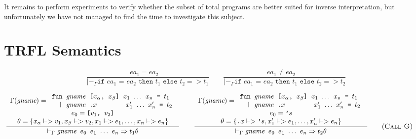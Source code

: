 \documentclass[10pt]{../sigplanconf}
\newcommand{\nfrac}[2]{\frac{\displaystyle{#1}}{\displaystyle{#2}}}
\newcommand{\tagsc}[1]{\tag{\scshape #1}}
\begin{document}
It remains to perform experiments to verify whether the subset of
total programs are better suited for inverse interpretation, but
unfortunately we have not managed to find the time to investigate this
subject.





\appendix
\section{TRFL Semantics}
\label{sec:semantics}


\begin{minipage}{2\linewidth}
  \centering

  \begin{equation}
    \nfrac{
      ea_1 = ea_2 \quad
    }{
      |-_\Gamma \texttt{if $ea_1$ = $ea_2$ then $t_1$ else $t_2$} => t_1
    }
    \qquad
    \nfrac{
      ea_1 \neq ea_2 \quad
    }{
      |-_\Gamma \texttt{if $ea_1$ = $ea_2$ then $t_1$ else $t_2$} => t_2
    } \tagsc{If}
\end{equation}

\begin{equation}
\hspace{-0.7cm}
  \nfrac{
    \begin{array}{c}
      \Gamma(\textit{gname}) =
      \begin{array}{l}
        \texttt{fun \textit{\rmfamily gname} [$x_\alpha$, $x_\beta$] $x_1$ $\ldots$ $x_n$ = $t_1$} \\
        \texttt{\ \ | \textit{\rmfamily gname}\ \texttt{.}$x$ \hspace{1.1cm} $x_1'$ $\ldots$ $x_n'$ = $t_2$} \\
      \end{array} \\
      e_0 = \texttt{[$v_1$, $v_2$]} \\
      \theta = \{x_\alpha |-> v_1, x_\beta |-> v_2, x_1 |-> e_1, \ldots, x_n |-> e_n\} 
    \end{array}
  }{
    |-_\Gamma \texttt{\textit{\rmfamily gname} $e_0$ $e_1$ $\ldots$ $e_n$} => t_1\theta
  }
\qquad
  \nfrac{
    \begin{array}{c}
      \Gamma(\textit{gname}) =
      \begin{array}{l}
        \texttt{fun \textit{\rmfamily gname} [$x_\alpha$, $x_\beta$] $x_1$ $\ldots$ $x_n$ = $t_1$} \\
        \texttt{\ \ | \textit{\rmfamily gname}\ \texttt{.}$x$ \hspace{1.1cm} $x_1'$ $\ldots$ $x_n'$ = $t_2$} \\
      \end{array} \\
      e_0 = \texttt{'}s \\
      \theta = \{\texttt{.}x |-> \texttt{'}s, x_1' |-> e_1, \ldots, x_n' |-> e_n\}
    \end{array}
  }{
    |-_\Gamma \texttt{\textit{\rmfamily gname} $e_0$ $e_1$ $\ldots$ $e_n$} => t_2\theta
  }
  \tagsc{Call-G}
\end{equation}


\end{minipage}
\end{document}
